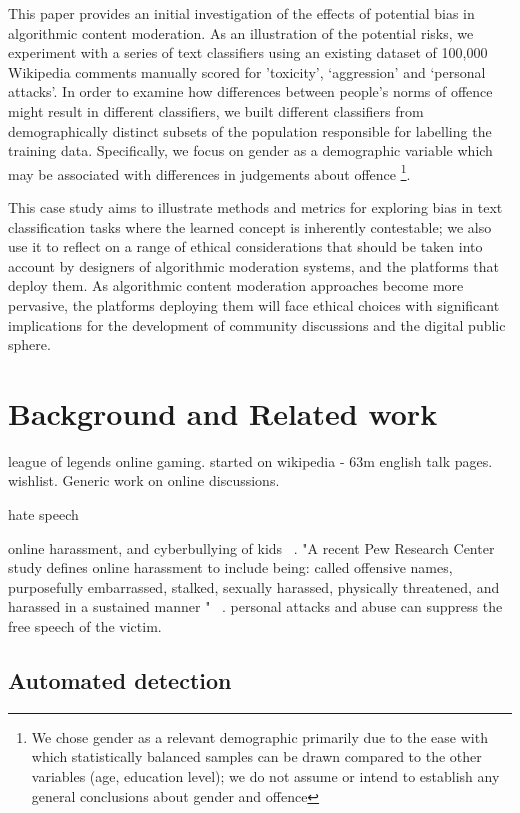 \documentclass[runningheads,a4paper]{llncs}
\begin{document}
This paper provides an initial investigation of the effects of potential bias in algorithmic content moderation. As an illustration of the potential risks, we experiment with a series of text classifiers using an existing dataset of 100,000 Wikipedia comments manually scored for 'toxicity', ‘aggression’ and ‘personal attacks’. In order to examine how differences between people's norms of offence might result in different classifiers, we built different classifiers from demographically distinct subsets of the population responsible for labelling the training data. Specifically, we focus on gender as a demographic variable which may be associated with differences in judgements about offence \footnote{We chose gender as a relevant demographic primarily due to the ease with which statistically balanced samples can be drawn compared to the other variables (age, education level); we do not assume or intend to establish any general conclusions about gender and offence}.
 
This case study aims to illustrate methods and metrics for exploring bias in text classification tasks where the learned concept is inherently contestable; we also use it to reflect on a range of ethical considerations that should be taken into account by designers of algorithmic moderation systems, and the platforms that deploy them. As algorithmic content moderation approaches become more pervasive, the platforms deploying them will face ethical choices with significant implications for the development of community discussions and the digital public sphere.


\section{Background and Related work}

league of legends online gaming. started on wikipedia - 63m english talk pages. wishlist.
Generic work on online discussions.

hate speech ~\cite{gagliardone2015countering}

online
harassment, and cyberbullying of kids ~\cite{schrock2011problematic,tokunaga2010following}.
 "A recent Pew Research Center study defines online
harassment to include being: called offensive names, purposefully
embarrassed, stalked, sexually harassed, physically threatened,
and harassed in a sustained manner " ~\cite{wolak2007does}.
personal attacks and abuse can suppress the free speech of the victim.

\subsection{Automated detection}
\end{document}
